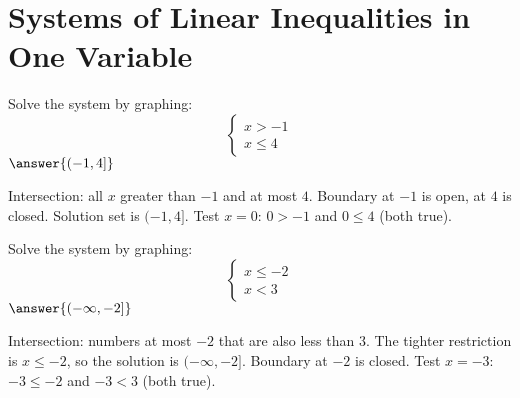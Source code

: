 \documentclass{ximera}
\begin{document}


\section*{Systems of Linear Inequalities in One Variable}

\begin{problem}
Solve the system by graphing:
\[
\begin{cases}
x > -1\\[4pt]
x \le 4
\end{cases}
\]
$\answer{(-1,4]}$
\begin{feedback}
Intersection: all $x$ greater than $-1$ and at most $4$. Boundary at $-1$ is open, at $4$ is closed. Solution set is $(-1,4]$. Test $x=0$: $0>-1$ and $0\le4$ (both true).
\end{feedback}
\end{problem}

\begin{problem}
Solve the system by graphing:
\[
\begin{cases}
x \le -2\\[4pt]
x < 3
\end{cases}
\]
$\answer{(-\infty,-2]}$
\begin{feedback}
Intersection: numbers at most $-2$ that are also less than $3$. The tighter restriction is $x\le-2$, so the solution is $(-\infty,-2]$. Boundary at $-2$ is closed. Test $x=-3$: $-3\le-2$ and $-3<3$ (both true).
\end{feedback}
\end{problem}

\end{document}
